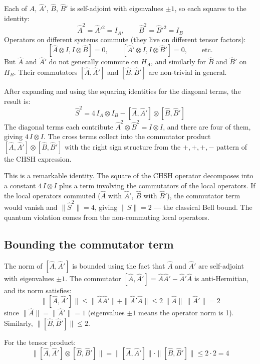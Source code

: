 \documentclass[11pt,a4paper]{article}
\begin{document}
Each of $\hat{A}$, $\hat{A}'$, $\hat{B}$, $\hat{B}'$ is self-adjoint with eigenvalues $\pm 1$, so each squares to the identity:
\[
\hat{A}^2 = \hat{A}'^2 = I_A, \qquad \hat{B}^2 = \hat{B}'^2 = I_B
\]
Operators on different systems commute (they live on different tensor factors):
\[
[\hat{A} \otimes I, I \otimes \hat{B}] = 0, \qquad [\hat{A}' \otimes I, I \otimes \hat{B}'] = 0, \qquad \text{etc.}
\]
But $\hat{A}$ and $\hat{A}'$ do not generally commute on $H_A$, and similarly for $\hat{B}$ and $\hat{B}'$ on $H_B$. Their commutators $[\hat{A}, \hat{A}']$ and $[\hat{B}, \hat{B}']$ are non-trivial in general.

After expanding and using the squaring identities for the diagonal terms, the result is:
\[
\hat{S}^2 = 4\, I_A \otimes I_B - [\hat{A}, \hat{A}'] \otimes [\hat{B}, \hat{B}']
\]
The diagonal terms each contribute $\hat{A}^2 \otimes \hat{B}^2 = I \otimes I$, and there are four of them, giving $4\, I \otimes I$. The cross terms collect into the commutator product $[\hat{A}, \hat{A}'] \otimes [\hat{B}, \hat{B}']$ with the right sign structure from the $+,+,+,-$ pattern of the CHSH expression.

This is a remarkable identity. The square of the CHSH operator decomposes into a constant $4\, I \otimes I$ plus a term involving the commutators of the local operators. If the local operators commuted ($\hat{A}$ with $\hat{A}'$, $\hat{B}$ with $\hat{B}'$), the commutator term would vanish and $\|\hat{S}^2\| = 4$, giving $\|\hat{S}\| = 2$ --- the classical Bell bound. The quantum violation comes from the non-commuting local operators.

\subsection{Bounding the commutator term}

The norm of $[\hat{A}, \hat{A}']$ is bounded using the fact that $\hat{A}$ and $\hat{A}'$ are self-adjoint with eigenvalues $\pm 1$. The commutator $[\hat{A}, \hat{A}'] = \hat{A}\hat{A}' - \hat{A}'\hat{A}$ is anti-Hermitian, and its norm satisfies:
\[
\|[\hat{A}, \hat{A}']\| \leq \|\hat{A}\hat{A}'\| + \|\hat{A}'\hat{A}\| \leq 2\, \|\hat{A}\|\, \|\hat{A}'\| = 2
\]
since $\|\hat{A}\| = \|\hat{A}'\| = 1$ (eigenvalues $\pm 1$ means the operator norm is 1). Similarly, $\|[\hat{B}, \hat{B}']\| \leq 2$.

For the tensor product:
\[
\|[\hat{A}, \hat{A}'] \otimes [\hat{B}, \hat{B}']\| = \|[\hat{A}, \hat{A}']\| \cdot \|[\hat{B}, \hat{B}']\| \leq 2 \cdot 2 = 4
\]
\end{document}
